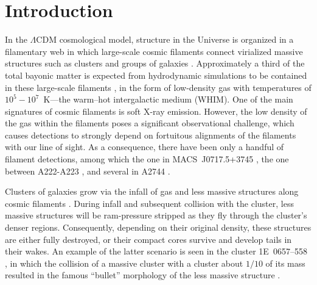 \section{Introduction}

In the $\Lambda$CDM cosmological model, structure in the Universe is organized in a filamentary web in which large-scale cosmic filaments connect virialized massive structures such as clusters and groups of galaxies \citep[e.g., ][]{Einasto1994}. Approximately a third of the total bayonic matter is expected from hydrodynamic simulations to be contained in these large-scale filaments \citep[e.g.][]{Dave2001}, in the form of low-density gas with temperatures of $10^5-10^7$~K---the warm--hot intergalactic medium (WHIM). One of the main signatures of cosmic filaments is soft X-ray emission. However, the low density of the gas within the filaments poses a significant observational challenge, which causes detections to strongly depend on fortuitous alignments of the filaments with our line of sight. As a consequence, there have been only a handful of filament detections, among which the one in MACS~J0717.5+3745 \citep{Ebeling2004}, the one between A222-A223 \citep{Dietrich2005, Werner2008, Dietrich2012}, and several in A2744 \citep{Eckert2015}.

Clusters of galaxies grow via the infall of gas and less massive structures along cosmic filaments \citep[e.g.,][]{Springel2006}. During infall and subsequent collision with the cluster, less massive structures will be ram-pressure stripped as they fly through the cluster's denser regions. Consequently, depending on their original density, these structures are either fully destroyed, or their compact cores survive and develop tails in their wakes. An example of the latter scenario is seen in the cluster 1E~0657--558 \citep{Elvis1992}, in which the collision of a massive cluster with a cluster about $1/10$ of its mass \citep{Springel2007, Mastropietro2008} resulted in the famous ``bullet'' morphology of the less massive structure \citep{Markevitch2002}.

